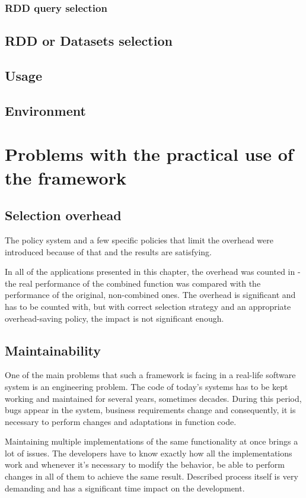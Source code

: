 \subsubsection{RDD query selection}
\subsection{RDD or Datasets selection}
\subsection{Usage}
\subsection{Environment}

\section{Problems with the practical use of the framework}

\subsection{Selection overhead}

The policy system and a few specific policies that limit the overhead were introduced because of that and the results are satisfying.

In all of the applications presented in this chapter, the overhead was counted in - the real performance of the combined function was compared with the performance of the original, non-combined ones. The overhead is significant and has to be counted with, but with correct selection strategy and an appropriate overhead-saving policy, the impact is not significant enough.

\subsection{Maintainability}

One of the main problems that such a framework is facing in a real-life software system is an engineering problem. The code of today's systems has to be kept working and maintained for several years, sometimes decades. During this period, bugs appear in the system, business requirements change and consequently, it is necessary to perform changes and adaptations in function code.

Maintaining multiple implementations of the same functionality at once brings a lot of issues. The developers have to know exactly how all the implementations work and whenever it's necessary to modify the behavior, be able to perform changes in all of them to achieve the same result. Described process itself is very demanding and has a significant time impact on the development. 

